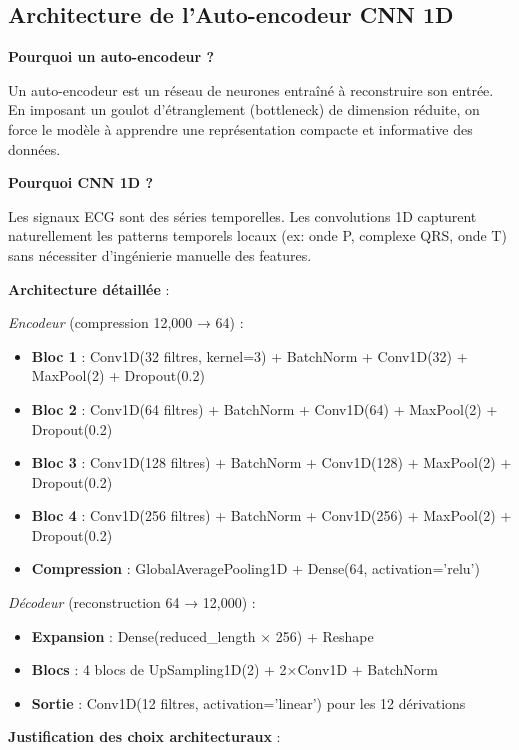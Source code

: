 \documentclass[12pt,a4paper]{article}
\begin{document}
\subsection{Architecture de l'Auto-encodeur CNN 1D}

\textbf{Pourquoi un auto-encodeur ?}

Un auto-encodeur est un réseau de neurones entraîné à reconstruire son entrée. En imposant un goulot d'étranglement (bottleneck) de dimension réduite, on force le modèle à apprendre une représentation compacte et informative des données.

\textbf{Pourquoi CNN 1D ?}

Les signaux ECG sont des séries temporelles. Les convolutions 1D capturent naturellement les patterns temporels locaux (ex: onde P, complexe QRS, onde T) sans nécessiter d'ingénierie manuelle des features.

\textbf{Architecture détaillée} :

\textit{Encodeur} (compression 12,000 → 64) :
\begin{itemize}
    \item \textbf{Bloc 1} : Conv1D(32 filtres, kernel=3) + BatchNorm + Conv1D(32) + MaxPool(2) + Dropout(0.2)
    \item \textbf{Bloc 2} : Conv1D(64 filtres) + BatchNorm + Conv1D(64) + MaxPool(2) + Dropout(0.2)
    \item \textbf{Bloc 3} : Conv1D(128 filtres) + BatchNorm + Conv1D(128) + MaxPool(2) + Dropout(0.2)
    \item \textbf{Bloc 4} : Conv1D(256 filtres) + BatchNorm + Conv1D(256) + MaxPool(2) + Dropout(0.2)
    \item \textbf{Compression} : GlobalAveragePooling1D + Dense(64, activation='relu')
\end{itemize}

\textit{Décodeur} (reconstruction 64 → 12,000) :
\begin{itemize}
    \item \textbf{Expansion} : Dense(reduced\_length × 256) + Reshape
    \item \textbf{Blocs} : 4 blocs de UpSampling1D(2) + 2×Conv1D + BatchNorm
    \item \textbf{Sortie} : Conv1D(12 filtres, activation='linear') pour les 12 dérivations
\end{itemize}

\textbf{Justification des choix architecturaux} :
\end{document}
